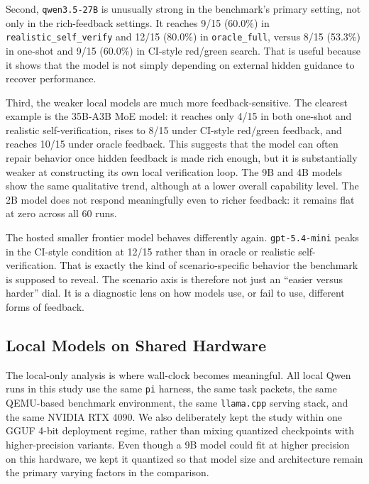 \documentclass[a4paper,fleqn]{cas-dc}
\DeclareRobustCommand{\tool}[1]{\texttt{\nolinkurl{#1}}}
\begin{document}
Second, \tool{qwen3.5-27B} is unusually strong in the benchmark's primary setting, not only in the rich-feedback settings. It reaches 9/15 (60.0\%) in \tool{realistic_self_verify} and 12/15 (80.0\%) in \tool{oracle_full}, versus 8/15 (53.3\%) in one-shot and 9/15 (60.0\%) in CI-style red/green search. That is useful because it shows that the model is not simply depending on external hidden guidance to recover performance.

Third, the weaker local models are much more feedback-sensitive. The clearest example is the 35B-A3B MoE model: it reaches only 4/15 in both one-shot and realistic self-verification, rises to 8/15 under CI-style red/green feedback, and reaches 10/15 under oracle feedback. This suggests that the model can often repair behavior once hidden feedback is made rich enough, but it is substantially weaker at constructing its own local verification loop. The 9B and 4B models show the same qualitative trend, although at a lower overall capability level. The 2B model does not respond meaningfully even to richer feedback: it remains flat at zero across all 60 runs.

The hosted smaller frontier model behaves differently again. \tool{gpt-5.4-mini} peaks in the CI-style condition at 12/15 rather than in oracle or realistic self-verification. That is exactly the kind of scenario-specific behavior the benchmark is supposed to reveal. The scenario axis is therefore not just an ``easier versus harder'' dial. It is a diagnostic lens on how models use, or fail to use, different forms of feedback.

\subsection{Local Models on Shared Hardware}

The local-only analysis is where wall-clock becomes meaningful. All local Qwen runs in this study use the same \tool{pi} harness, the same task packets, the same QEMU-based benchmark environment, the same \tool{llama.cpp} serving stack, and the same NVIDIA RTX 4090. We also deliberately kept the study within one GGUF 4-bit deployment regime, rather than mixing quantized checkpoints with higher-precision variants. Even though a 9B model could fit at higher precision on this hardware, we kept it quantized so that model size and architecture remain the primary varying factors in the comparison.
\end{document}
